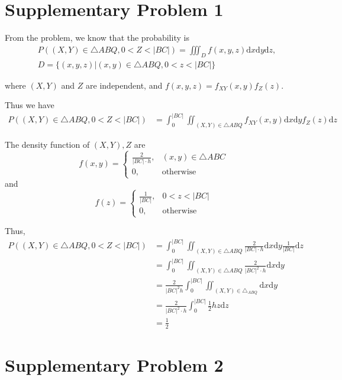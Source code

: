 \documentclass[a4paper, UTF-8]{article}
\theoremstyle{plain}
\begin{document}
\section{Supplementary Problem 1}

From the problem, we know that the probability is 
\begin{align*}
& P((X, Y) \in \triangle ABQ, 0 < Z < |BC|) = \iiint_{D} f(x, y, z) \mathrm{d}x \mathrm{d}y \mathrm{d}z, \\ & D = \{(x, y, z)|(x, y) \in \triangle ABQ, 0 < z < |BC|\} 
\end{align*}

where $(X,Y)$ and $Z$ are independent, and $f(x, y, z) = f_{XY}(x,y)f_{Z}(z)$.

Thus we have 
\begin{align*}
P((X, Y) \in \triangle ABQ, 0 < Z < |BC|) &= \int_0^{|BC|}\iint_{(X,Y) \in \triangle ABQ} f_{XY}(x,y) \mathrm{d}x \mathrm{d}y  f_{Z}(z) \mathrm{d}z
\end{align*}

The density function of $(X,Y), Z$ are 
$$
f(x,y) = \begin{cases}
\frac{2}{|BC| \cdot h}, & (x,y) \in \triangle ABC\\
0, & \text{otherwise}
\end{cases}
$$
and 
$$
f(z) = \begin{cases}
\frac{1}{|BC|}, & 0 < z < |BC|\\
0, & \text{otherwise}
\end{cases}
$$

Thus,
\begin{align*}
P((X, Y) \in \triangle ABQ, 0 < Z < |BC|) &= \int_0^{|BC|}\iint_{(X,Y) \in \triangle ABQ} \frac{2}{|BC| \cdot h} \mathrm{d}x \mathrm{d}y  \frac{1}{|BC|} \mathrm{d}z\\
&= \int_0^{|BC|}\iint_{(X,Y) \in \triangle ABQ} \frac{2}{|BC|^2 \cdot h} \mathrm{d}x \mathrm{d}y\\
&= \frac{2}{|BC|^2 h} \int_0^{|BC|}\iint_{(X,Y)\in \triangle_{ABQ}} \mathrm{d}x\mathrm{d}y\\
&= \frac{2}{|BC|^2\cdot h} \int_{0}^{|BC|} \frac{1}{2}hz\mathrm{d}z\\
&= \frac{1}{2}
\end{align*}

\section{Supplementary Problem 2}
\end{document}

